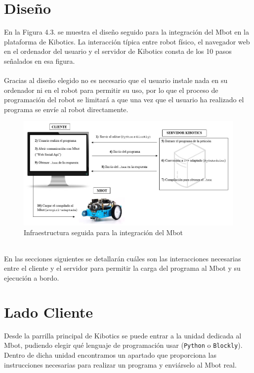 \documentclass{report}
\begin{document}
\section{Diseño}

En la Figura 4.3. se muestra el diseño seguido para la integración del Mbot en la plataforma de Kibotics. La interacción típica entre robot físico, el navegador web en el ordenador del usuario y el servidor de Kibotics consta de los 10 pasos señalados en esa figura.
\\
\\
Gracias al diseño elegido no es necesario que el usuario instale nada en su ordenador ni en el robot para permitir su uso, por lo que el proceso de programación del robot se limitará a que una vez que el usuario ha realizado el programa se envíe al robot directamente.
\\
\begin{figure}[h!]
  \centering
    \includegraphics[width=1\textwidth]{images/infraestructura_mbot.png}
  \caption{Infraestructura seguida para la integración del Mbot}
  \label{Infraestructura seguida para la integración del Mbot}
\end{figure}
\\
En las secciones siguientes se detallarán cuáles son las interacciones necesarias entre el cliente y el servidor para permitir la carga del programa al Mbot y su ejecución a bordo.

\section{Lado Cliente}

Desde la parrilla principal de Kibotics se puede entrar a la unidad dedicada al Mbot, pudiendo elegir qué lenguaje de programación usar (\texttt{Python} o \texttt{Blockly}). Dentro de dicha unidad encontramos un apartado que proporciona las instrucciones necesarias para realizar un programa y enviárselo al Mbot real.
\end{document}
